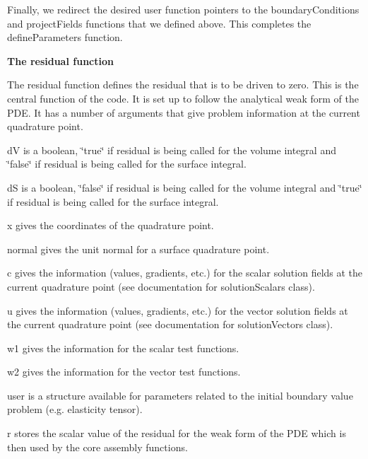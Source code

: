 Finally, we redirect the desired user function pointers to the {\ttfamily boundary\-Conditions} and {\ttfamily project\-Fields} functions that we defined above. This completes the {\ttfamily define\-Parameters} function.


\begin{DoxyCodeInclude}

\end{DoxyCodeInclude}


{\bfseries  The {\ttfamily residual} function }

The residual function defines the residual that is to be driven to zero. This is the central function of the code. It is set up to follow the analytical weak form of the P\-D\-E. It has a number of arguments that give problem information at the current quadrature point.


\begin{DoxyCodeInclude}

\end{DoxyCodeInclude}


{\ttfamily d\-V} is a boolean, \char`\"{}true\char`\"{} if {\ttfamily residual} is being called for the volume integral and \char`\"{}false\char`\"{} if {\ttfamily residual} is being called for the surface integral.\par
{\ttfamily d\-S} is a boolean, \char`\"{}false\char`\"{} if {\ttfamily residual} is being called for the volume integral and \char`\"{}true\char`\"{} if {\ttfamily residual} is being called for the surface integral.\par
{\ttfamily x} gives the coordinates of the quadrature point.\par
{\ttfamily normal} gives the unit normal for a surface quadrature point.\par
{\ttfamily c} gives the information (values, gradients, etc.) for the scalar solution fields at the current quadrature point (see documentation for solution\-Scalars class).\par
{\ttfamily u} gives the information (values, gradients, etc.) for the vector solution fields at the current quadrature point (see documentation for solution\-Vectors class).\par
{\ttfamily w1} gives the information for the scalar test functions.\par
{\ttfamily w2} gives the information for the vector test functions.\par
{\ttfamily user} is a structure available for parameters related to the initial boundary value problem (e.\-g. elasticity tensor).\par
{\ttfamily r} stores the scalar value of the residual for the weak form of the P\-D\-E which is then used by the core assembly functions.

